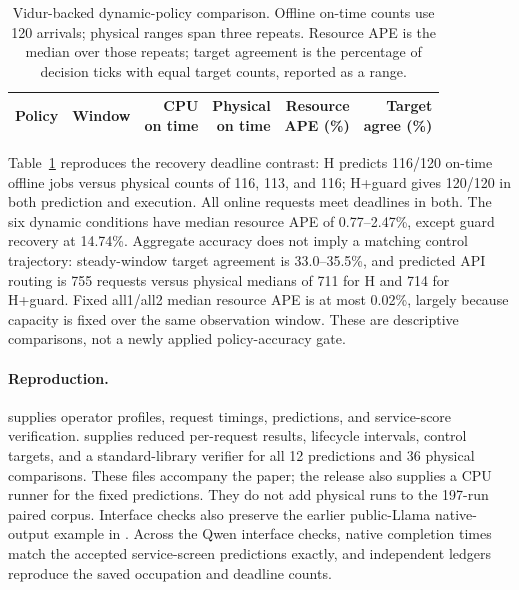 \begin{table}[t]
\centering
\small
\caption{Vidur-backed dynamic-policy comparison. Offline on-time counts use
120 arrivals; physical ranges span three repeats. Resource APE is the median
over those repeats; target agreement is the percentage of decision ticks
with equal target counts, reported as a range.}
\label{tab:vidur-control}
\setlength{\tabcolsep}{2pt}
\par\vspace{4pt}
\begin{tabular*}{\linewidth}{@{\extracolsep{\fill}}llrrrr@{}}
\toprule
Policy & Window & \shortstack{CPU\\on time} & \shortstack{Physical\\on time} & \shortstack{Resource\\APE (\%)} & \shortstack{Target\\agree (\%)}\\
\midrule

\end{tabular*}
\end{table}

Table~\ref{tab:vidur-control} reproduces the recovery deadline contrast:
H predicts 116/120 on-time offline jobs versus physical counts of 116, 113,
and 116; H+guard gives 120/120 in both prediction and execution. All online
requests meet deadlines in both. The six dynamic conditions have median
resource APE of 0.77--2.47\%, except guard recovery at 14.74\%.
Aggregate accuracy does not imply a matching control trajectory: steady-window
target agreement is 33.0--35.5\%, and predicted API routing is 755 requests
versus physical medians of 711 for H and 714 for H+guard. Fixed all1/all2
median resource APE is at most 0.02\%, largely because capacity is fixed over
the same observation window. These are descriptive comparisons, not a newly
applied policy-accuracy gate.

\paragraph{Reproduction.}
 supplies operator profiles, request
timings, predictions, and service-score verification.
 supplies reduced per-request results, lifecycle
intervals, control targets, and a standard-library verifier for all 12
predictions and 36 physical comparisons. These files accompany the paper;
the release also supplies a CPU runner for the fixed predictions. They
do not add physical runs to the 197-run paired corpus. Interface checks
also preserve the earlier public-Llama native-output example in
. Across the Qwen interface checks, native completion
times match the accepted service-screen predictions exactly, and independent
ledgers reproduce the saved occupation and deadline counts.

